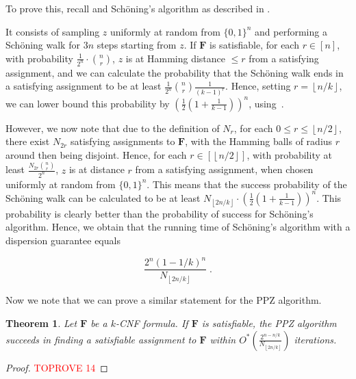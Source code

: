 \documentclass[11pt, letterpaper]{article}
\newtheorem{theorem}{Theorem}
\theoremstyle{definition}
\newcommand{\f}{\mathbf{F}}
\newcommand{\sch}{Sch\"{o}ning\xspace}
\newcommand{\floor}[1]{{\left\lfloor{#1}\right\rfloor}}
\begin{document}
\medskip \noindent
 

To prove this, recall  and \sch's algorithm as described in . 
\obssch*

\noindent
It consists of sampling $z$ uniformly at random from $\{0,1\}^n$ and performing a \sch walk for $3n$ steps starting from $z$. If $\f$ is satisfiable, for each $r \in [n]$, with probability $\frac{1}{2^n} \cdot \binom{n}{r}$, $z$ is at Hamming distance $\leq r$ from a satisfying assignment, and we can calculate the probability that the \sch walk ends in a satisfying assignment to be at least $\frac{1}{2^n} \binom{n}{r}\frac{1}{(k-1)^r}$. Hence, setting $r=\floor{n/k}$, we can lower bound this probability by $\left(\frac{1}{2}\left(1+\frac{1}{k-1}\right)\right)^n$, using~.  

\medskip \noindent
However, we now note that due to the definition of $N_r$, for each $0 \leq r \leq \floor{n/2}$, there exist $N_{2r}$ satisfying assignments to $\f$, with the Hamming balls of radius $r$ around then being disjoint. Hence, for each $r \in [\floor{n/2}]$, with probability at least $\frac{N_{2r}\binom{n}{r}}{2^n}$, $z$ is at distance $r$ from a satisfying assignment, when chosen uniformly at random from $\{0,1\}^n$. This means that the success probability of the \sch walk can be calculated to be at least $N_{\floor{2n/k}} \cdot \left(\frac{1}{2}\left(1+\frac{1}{k-1}\right)\right)^n$. This probability is clearly better than the probability of success for \sch's algorithm. Hence, we obtain that the running time of \sch's algorithm with a dispersion guarantee equals 

\[  \frac{2^n \left(1-1/k\right)^n}{N_{\floor{2n/k}}} \;.\]
 

Now we note that we can prove a similar statement for the PPZ algorithm. 
 
\begin{theorem}
    \label{thm:PPZfaster}
    Let $\f$ be a $k$-CNF formula. If $\f$ is satisfiable, the PPZ algorithm succeeds in finding a satisfiable assignment to $\f$ within $O^*\left(  \frac{ 2^{n-n/k}}{N_{\floor{2n/k}}}\right)$ iterations.
\end{theorem} 
\begin{proof}\textcolor{red}{TOPROVE 14}\end{proof}
 
\end{document}
